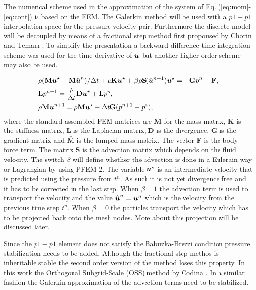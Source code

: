 The numerical scheme used in the approximation of the system of Eq. (\ref{eq:mom}-\ref{eq:cont}) is based on the FEM. The Galerkin method will be used with a $p1-p1$ interpolation space for the pressure-velocity pair. Furthermore the discrete model will be decoupled by means of a fractional step method first propoused by Chorin \cite{chorin} and Temam \cite{temam}. To simplify the presentation a backward difference time integration scheme was used for the time derivative of $\boldsymbol{u}$ but another higher order scheme may also be used. 

\begin{align}\label{eq:masamat}
&\rho (\textbf{M}\boldsymbol{u}^\star-\textbf{M}\hat{\boldsymbol{u}}^n)/\Delta t+\mu\textbf{K}\boldsymbol{u}^{\star} +\beta\rho\textbf{S}(\bar{\boldsymbol{u}}^{n+1})\boldsymbol{u}^{\star}  = -\textbf{G}p^n+ \textbf{F},
\\\label{eq:matpres2}
& \textbf{L}p^{n+1}=\frac{\rho}{\Delta t}\textbf{D}\boldsymbol{u}^\star+ \textbf{L}  p^{n},
\\\label{eq:matunm2}
&\rho \bar{\textbf{M}}\boldsymbol{u}^{n+1}=\rho \bar{\textbf{M}}\boldsymbol{u}^\star-\Delta t\textbf{G}(p^{n+1}- p^n),
\end{align}
where the standard assembled FEM matrices are \textbf{M} for the mass matrix, \textbf{K} is the stiffness matrix, \textbf{L} is the Laplacian matrix, \textbf{D} is the divergence, \textbf{G} is the gradient matrix and $\bar{\textbf{M}}$ is the lumped mass matrix. The vector \textbf{F} is the body force term. The matrix \textbf{S} is the advection matrix which depends on the fluid velocity. The switch $\beta$ will define whether the advection is done in a Eulerain way or Lagrangian by using PFEM-2. The variable $\boldsymbol{u}^\star$ is an intermediate velocity that is predicted using the pressure from $t^n$. As such it is not yet divergence free and it has to be corrected in the last step. When $\beta=1$ the advection term is used to transport the velocity and the value $\hat{\boldsymbol{u}}^n=\boldsymbol{u}^n$ which is the velocity from the previous time step $t^n$. When $\beta=0$ the particles transport the velocity which has to be projected back onto the mesh nodes. More about this projection will be discussed later.

Since the $p1-p1$ element does not satisfy the Babuzka-Brezzi condition pressure stabilization needs to be added. Although the fractional step methos is inheritable stable the second order version of the method loses this property. In this work the Orthogonal Subgrid-Scale (OSS) method by Codina \cite{codina-oss-press}. In a similar fashion the Galerkin approximation of the advection terms need to be stabilized.
